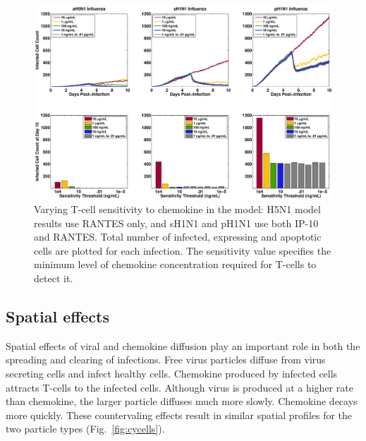\documentclass[10pt]{article}
\begin{document}
\begin{figure}[ht!]
\begin{center}
 \includegraphics[width=\textwidth]{sensitivity}
 \end{center}
\caption{Varying T-cell sensitivity to chemokine in the model: H5N1 model results use RANTES  only, and sH1N1 and pH1N1 use both IP-10 and RANTES. Total number of infected, expressing and apoptotic cells are plotted for each infection.  The sensitivity value specifies the minimum level of chemokine concentration required for T-cells to detect it. } 
 \label{fig:sensitivity}
\end{figure}


\subsection*{Spatial effects}

Spatial effects of viral and chemokine diffusion play an important role in both the spreading and clearing of infections.  Free virus particles diffuse from virus secreting cells and infect healthy cells.  Chemokine produced by infected cells attracts T-cells to the infected cells.  Although virus is produced at a higher rate than chemokine, the larger particle diffuses much more slowly.  Chemokine decays more quickly.  These countervaling effects result in similar spatial profiles for the two particle types (Fig.~\ref{fig:cycells}).
\end{document}
